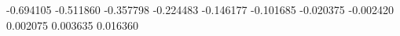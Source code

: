 -0.694105
-0.511860
-0.357798
-0.224483
-0.146177
-0.101685
-0.020375
-0.002420
0.002075
0.003635
0.016360
